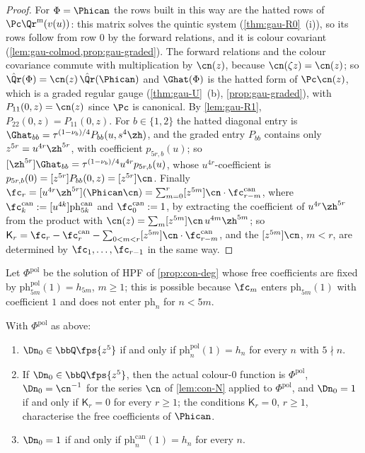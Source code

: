 \begin{proof}
For $\Phi=\Phican$ the rows built in this way are the hatted rows of $\Pc\Qr^{\mathrm m}(v(u))$: this matrix solves the quintic system (\cref{thm:gau-R0}~(i)), so its rows follow from row $0$ by the forward relations, and it is colour covariant (\cref{lem:gau-colmod,prop:gau-graded}). The forward relations and the colour covariance commute with multiplication by $\cn(z)$, because $\cn(\zeta z)=\cn(z)$; so $\hat\Qr(\Phi)=\cn(z)\,\hat\Qr(\Phican)$ and $\Ghat(\Phi)$ is the hatted form of $\Pc\cn(z)$, which is a graded regular gauge (\cref{thm:gau-U}~(b), \cref{prop:gau-graded}), with $P_{11}(0,z)=\cn(z)$ since $\Pc$ is canonical. By \cref{lem:gau-R1}, $P_{22}(0,z)=P_{11}(0,z)$. For $b\in\{1,2\}$ the hatted diagonal entry is $\Ghat_{bb}=\tau^{(1-\nu_b)/4}P_{bb}(u,s^4\zh)$, and the graded entry $P_{bb}$ contains only $z^{5r}=u^{4r}\zh^{5r}$, with coefficient $p_{5r,b}(u)$; so $[\zh^{5r}]\Ghat_{bb}=\tau^{(1-\nu_b)/4}u^{4r}p_{5r,b}(u)$, whose $u^{4r}$-coefficient is $p_{5r,b}(0)=[z^{5r}]P_{bb}(0,z)=[z^{5r}]\cn$. Finally $\fc_r=[u^{4r}\zh^{5r}](\Phican\cn)=\sum_{m=0}^r[z^{5m}]\cn\cdot\fc^{\mathrm{can}}_{r-m}$, where $\fc^{\mathrm{can}}_k:=[u^{4k}]\mathrm{ph}^{\mathrm{can}}_{5k}$ and $\fc^{\mathrm{can}}_0:=1$, by extracting the coefficient of $u^{4r}\zh^{5r}$ from the product with $\cn(z)=\sum_m[z^{5m}]\cn\,u^{4m}\zh^{5m}$; so $\mathsf K_r=\fc_r-\fc^{\mathrm{can}}_r-\sum_{0<m<r}[z^{5m}]\cn\cdot\fc^{\mathrm{can}}_{r-m}$, and the $[z^{5m}]\cn$, $m<r$, are determined by $\fc_1,\dots,\fc_{r-1}$ in the same way.
\end{proof}

Let $\Phi^{\mathrm{pol}}$ be the solution of HPF of \cref{prop:con-deg} whose free coefficients are fixed by $\mathrm{ph}^{\mathrm{pol}}_{5m}(1)=h_{5m}$, $m\geq1$; this is possible because $\fc_m$ enters $\mathrm{ph}_{5m}(1)$ with coefficient $1$ and does not enter $\mathrm{ph}_n$ for $n<5m$.

\begin{thm}
\label{thm:con-conn}
With $\Phi^{\mathrm{pol}}$ as above:
\begin{enumerate}
\item $\Dn_0\in\bbQ\fps{z^5}$ if and only if $\mathrm{ph}^{\mathrm{pol}}_n(1)=h_n$ for every $n$ with $5\nmid n$.
\item If $\Dn_0\in\bbQ\fps{z^5}$, then the actual colour-$0$ function is $\Phi^{\mathrm{pol}}$, $\Dn_0=\cn^{-1}$ for the series $\cn$ of \cref{lem:con-N} applied to $\Phi^{\mathrm{pol}}$, and $\Dn_0=1$ if and only if $\mathsf K_r=0$ for every $r\geq1$; the conditions $\mathsf K_r=0$, $r\geq1$, characterise the free coefficients of $\Phican$.
\item $\Dn_0=1$ if and only if $\mathrm{ph}^{\mathrm{can}}_n(1)=h_n$ for every $n$.
\end{enumerate}
\end{thm}

